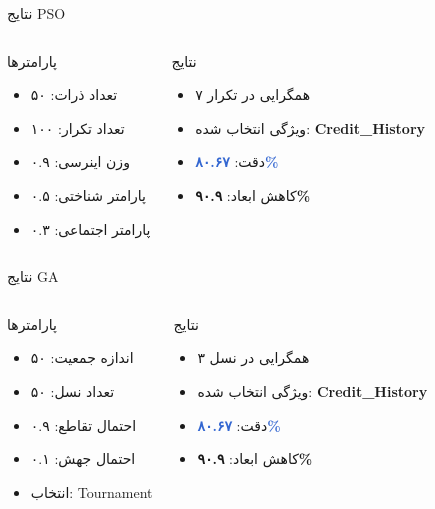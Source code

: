 \documentclass[aspectratio=169]{beamer}
\begin{document}
\begin{frame}{نتایج PSO}
\begin{columns}
\begin{block}{پارامترها}
\begin{itemize}
\item تعداد ذرات: ۵۰
\item تعداد تکرار: ۱۰۰
\item وزن اینرسی: ۰.۹
\item پارامتر شناختی: ۰.۵
\item پارامتر اجتماعی: ۰.۳
\end{itemize}
\end{block}

\begin{block}{نتایج}
\begin{itemize}
\item همگرایی در تکرار ۷
\item ویژگی انتخاب شده: \textcolor{important}{\textbf{Credit\_History}}
\item دقت: \textcolor{highlight}{\textbf{۸۰.۶۷\%}}
\item کاهش ابعاد: \textcolor{success}{\textbf{۹۰.۹\%}}
\end{itemize}
\end{block}
\end{columns}
\end{frame}

\begin{frame}{نتایج GA}
\begin{columns}
\begin{block}{پارامترها}
\begin{itemize}
\item اندازه جمعیت: ۵۰
\item تعداد نسل: ۵۰
\item احتمال تقاطع: ۰.۹
\item احتمال جهش: ۰.۱
\item انتخاب: Tournament
\end{itemize}
\end{block}

\begin{block}{نتایج}
\begin{itemize}
\item همگرایی در نسل ۳
\item ویژگی انتخاب شده: \textcolor{important}{\textbf{Credit\_History}}
\item دقت: \textcolor{highlight}{\textbf{۸۰.۶۷\%}}
\item کاهش ابعاد: \textcolor{success}{\textbf{۹۰.۹\%}}
\end{itemize}
\end{block}
\end{columns}
\end{frame}
\end{document}

